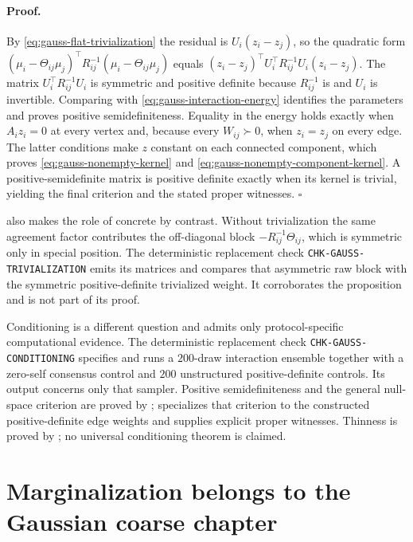\paragraph{Proof.}
By \eqref{eq:gauss-flat-trivialization} the residual is $U_i(z_i-z_j)$, so the quadratic form $(\mu_i-\Theta_{ij}\mu_j)^\top R_{ij}^{-1}(\mu_i-\Theta_{ij}\mu_j)$ equals $(z_i-z_j)^\top U_i^\top R_{ij}^{-1}U_i(z_i-z_j)$. The matrix $U_i^\top R_{ij}^{-1}U_i$ is symmetric and positive definite because $R_{ij}^{-1}$ is and $U_i$ is invertible. Comparing with \eqref{eq:gauss-interaction-energy} identifies the parameters and proves positive semidefiniteness. Equality in the energy holds exactly when $A_iz_i=0$ at every vertex and, because every $W_{ij}\succ0$, when $z_i=z_j$ on every edge. The latter conditions make $z$ constant on each connected component, which proves \eqref{eq:gauss-nonempty-kernel} and \eqref{eq:gauss-nonempty-component-kernel}. A positive-semidefinite matrix is positive definite exactly when its kernel is trivial, yielding the final criterion and the stated proper witnesses. $\square$

 also makes the role of  concrete by contrast. Without trivialization the same agreement factor contributes the off-diagonal block $-R_{ij}^{-1}\Theta_{ij}$, which is symmetric only in special position. The deterministic replacement check \texttt{CHK-GAUSS-TRIVIALIZATION} emits its matrices and compares that asymmetric raw block with the symmetric positive-definite trivialized weight. It corroborates the proposition and is not part of its proof. 

Conditioning is a different question and admits only protocol-specific computational evidence. The deterministic replacement check \texttt{CHK-GAUSS-CONDITIONING} specifies and runs a $200$-draw interaction ensemble together with a zero-self consensus control and $200$ unstructured positive-definite controls. Its output concerns only that sampler. Positive semidefiniteness and the general null-space criterion are proved by ;  specializes that criterion to the constructed positive-definite edge weights and supplies explicit proper witnesses. Thinness is proved by ; no universal conditioning theorem is claimed. 

\section{Marginalization belongs to the Gaussian coarse chapter}
\label{sec:gauss-open}

